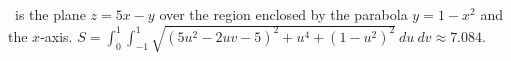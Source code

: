{\surfaceS\ is the plane $z=5x-y$ over the region enclosed by the parabola $y=1-x^2$ and the $x$-axis.
}
{$S =\int_0^1\int_{-1}^{1}\sqrt{(5u^2-2uv-5)^2+u^4+(1-u^2)^2}\ du\ dv \approx 7.084$.
}
